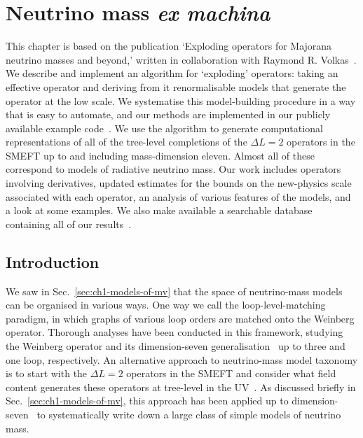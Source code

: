 \graphicspath{{img/chapter_2/}}

\chapter{Neutrino mass \textit{ex machina}}
\label{chapter:mv-models}

\begin{synopsis}
  This chapter is based on the publication `Exploding operators for Majorana
  neutrino masses and beyond,' written in collaboration with Raymond R.
  Volkas~\cite{Gargalionis:2020xvt}. We describe and implement an algorithm for
  `exploding' operators: taking an effective operator and deriving from it
  renormalisable models that generate the operator at the low scale. We
  systematise this model-building procedure in a way that is easy to automate,
  and our methods are implemented in our publicly available example
  code~\cite{neutrinomass2020}. We use the algorithm to generate computational
  representations of all of the tree-level completions of the $\Delta L = 2$
  operators in the SMEFT up to and including mass-dimension eleven. Almost all
  of these correspond to models of radiative neutrino mass. Our work includes
  operators involving derivatives, updated estimates for the bounds on the
  new-physics scale associated with each operator, an analysis of various
  features of the models, and a look at some examples. We also make available a
  searchable database containing all of our
  results~\cite{gargalionis_john_2020_4054618}.
\end{synopsis}

\section{Introduction}

We saw in Sec.~\ref{sec:ch1-models-of-mv} that the space of neutrino-mass models can
be organised in various ways. One way we call the loop-level-matching paradigm,
in which graphs of various loop orders are matched onto the Weinberg operator.
Thorough analyses have been conducted in this framework, studying the Weinberg
operator and its dimension-seven generalisation~\cite{Bonnet:2012kz,
  Sierra:2014rxa, Cepedello:2018rfh, Cepedello:2017eqf} up to three and one
loop, respectively. An alternative approach to neutrino-mass model taxonomy is
to start with the $\Delta L = 2$ operators in the SMEFT and consider what field
content generates these operators at tree-level in the UV~\cite{Babu:2001ex,
  deGouvea:2007qla, PhysRevD.87.073007, Cai:2014kra}. As discussed briefly in
Sec.~\ref{sec:ch1-models-of-mv}, this approach has been applied up to
dimension-seven~\cite{Cai:2014kra} to systematically write down a large class of
simple models of neutrino mass.

